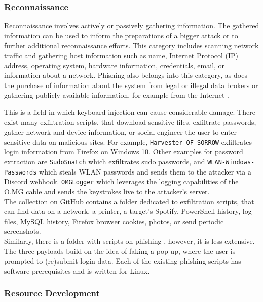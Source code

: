 \subsubsection{Reconnaissance}

Reconnaissance involves actively or passively gathering information. The gathered information can be used to inform the preparations
of a bigger attack or to further additional reconnaissance efforts. This category includes scanning network traffic and gathering host information such as name, Internet Protocol (IP) address, operating system,
hardware information, credentials, email, or information about a network. Phishing also belongs into this category, as does the purchase of information about the system from legal or illegal data brokers or gathering publicly available information, for example from the Internet \cite{MITREATTCK}.

This is a field in which keyboard injection can cause considerable damage. There exist many exfiltration scripts, that download sensitive files, exfiltrate passwords, gather network and device information, or social engineer the user to enter sensitive data on malicious sites.
For example, \verb|Harvester_OF_SORROW| \cite{OmgpayloadsPayloadsLibrary} exfiltrates login information from Firefox on Windows 10. Other examples for password extraction are \verb|SudoSnatch| \cite{OmgpayloadsPayloadsLibrary} which exfiltrates sudo passwords, and \verb|WLAN-Windows-Passwords| \cite{OmgpayloadsPayloadsLibrary} which steals WLAN passwords and sends them to the attacker via a Discord webhook. 
\verb|OMGLogger| \cite{OmgpayloadsPayloadsLibrary} which leverages the logging capabilities of the O.MG cable and sends the keystrokes live to the attacker's server. \\
The collection on GitHub contains a folder dedicated to exfiltration scripts, that can find data on a network, a printer, a target's Spotify, PowerShell history, log files, MySQL history,
Firefox browser cookies, photos, or send periodic screenshots. \\
Similarly, there is a folder with scripts on phishing  \cite{OmgpayloadsPayloadsLibrary}, however, it is less extensive. The three payloads build on the idea of faking a pop-up,
where the user is prompted to (re)submit login data. Each of the existing phishing scripts has software prerequisites and is written for Linux. \\


\subsubsection{Resource Development}

